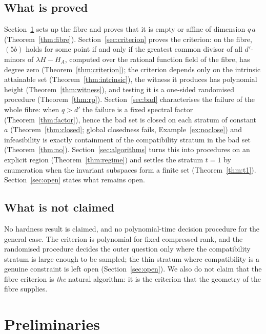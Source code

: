 \documentclass[journal]{IEEEtran}
\theoremstyle{plainn}
\theoremstyle{remark}
\begin{document}
\subsection{What is proved}

Section~\ref{sec:prelim} sets up the fibre and proves that it is empty or affine of dimension $q\,a$
(Theorem~\ref{thm:fibre}). Section~\ref{sec:criterion} proves the criterion: on the fibre,
$(5b)$ holds for some point if and only if the greatest common divisor of all $d'$-minors of
$\lambda H-H_A$, computed over the rational function field of the fibre, has degree zero
(Theorem~\ref{thm:criterion}); the criterion depends only on the intrinsic attainable set
(Theorem~\ref{thm:intrinsic}), the witness it produces has polynomial height
(Theorem~\ref{thm:witness}), and testing it is a one-sided randomised procedure
(Theorem~\ref{thm:rp}). Section~\ref{sec:bad} characterises the failure of the whole fibre: when
$q>d'$ the failure is a fixed spectral factor (Theorem~\ref{thm:factor}), hence the bad set is closed on each stratum of constant $a$ (Theorem~\ref{thm:closed}; global closedness fails, Example~\ref{ex:noclose}) and infeasibility is exactly containment of the
compatibility stratum in the bad set (Theorem~\ref{thm:no}). Section~\ref{sec:algorithms} turns this into procedures on an
explicit region (Theorem~\ref{thm:regime}) and settles the stratum $t=1$ by enumeration when the invariant subspaces form a finite set
(Theorem~\ref{thm:t1}). Section~\ref{sec:open} states what remains open.

\subsection{What is not claimed}

No hardness result is claimed, and no polynomial-time decision procedure for the general case. The
criterion is polynomial for fixed compressed rank, and the randomised procedure decides the outer
question only where the compatibility stratum is large enough to be sampled; the thin stratum where
compatibility is a genuine constraint is left open (Section~\ref{sec:open}). We also do not claim that
the fibre criterion is \emph{the} natural algorithm: it is the criterion that the geometry of the
fibre supplies.

\section{Preliminaries}\label{sec:prelim}
\end{document}
